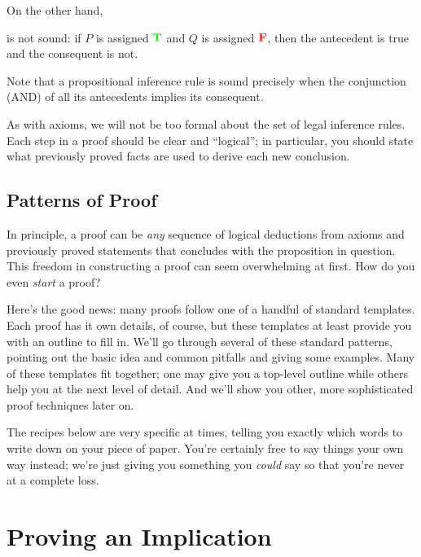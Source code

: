 \begin{rul*}
\end{rul*}

On the other hand,
\begin{nonrul*}
\end{nonrul*}
\noindent is not sound: if $P$ is assigned $\textcolor{green}{\mathbf{T}}$ and $Q$ is assigned
$\textcolor{red}{\mathbf{F}}$, then the antecedent is true and the consequent is not.

Note that a propositional inference rule is sound precisely when the conjunction
(AND) of all its antecedents implies its consequent.

As with axioms, we will not be too formal about the set of legal inference
rules.  Each step in a proof should be clear and ``logical''; in
particular, you should state what previously proved facts are used to
derive each new conclusion.

\subsection{Patterns of Proof}

In principle, a proof can be \textit{any} sequence of logical
deductions from axioms and previously proved statements that concludes
with the proposition in question.  This freedom in constructing a
proof can seem overwhelming at first.  How do you even \textit{start}
a proof?

Here's the good news: many proofs follow one of a handful of standard
templates.  Each proof has it own details, of course, but these
templates at least provide you with an outline to fill in.  We'll go
through several of these standard patterns, pointing out the basic
idea and common pitfalls and giving some examples.  Many of these
templates fit together; one may give you a top-level outline while
others help you at the next level of detail.  And we'll show you
other, more sophisticated proof techniques later on.

The recipes below are very specific at times, telling you exactly
which words to write down on your piece of paper.  You're certainly
free to say things your own way instead; we're just giving you
something you \textit{could} say so that you're never at a complete
loss.

\section{Proving an Implication}
\label{sec:prove_implies}

